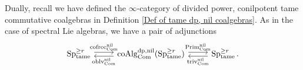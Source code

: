 \begin{remark}
Dually, recall we have defined the $\infty$-category of divided power, conilpotent tame commutative coalgebras in Definition \ref{Def of tame dp, nil coalgebras}. 
As in the case of spectral Lie algebras, we have a pair of adjunctions
\[
\begin{tikzcd}
\Sp^{\geq r}_{\tame} & \coAlg^{\divpow, \nil}_{\Com}(\Sp^{\geq r}_{\tame}) & \Sp^{\geq r}_{\tame}.
	\arrow[from=1-1, to= 1-2, shift left = 1, "\cofree^{\nil}_{\Com}" above]
	\arrow[from=1-2, to=1-1, shift left = 1, "\oblv^{\nil}_{\Com}" below]
	\arrow[from=1-2, to= 1-3, shift left = 1, "\operatorname{Prim}^{\nil}_{\Com}" above]
	\arrow[from=1-3, to=1-2, shift left = 1, "\trivial^{\nil}_{\Com}" below]
\end{tikzcd}
\]
\end{remark}






